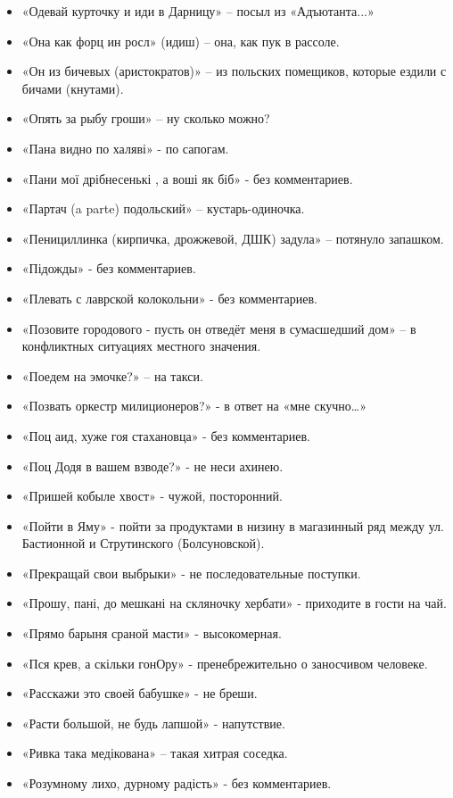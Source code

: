 \begin{itemize}
\item  «Одевай курточку и иди в Дарницу» –  посыл из «Адъютанта...»
\item  «Она как форц ин росл» (идиш) – она, как пук в рассоле.
\item  «Он из бичевых (аристократов)» – из польских помещиков, которые ездили с бичами (кнутами). 
\item  «Опять за рыбу гроши» – ну сколько можно?
\item  «Пана видно по халяві» - по сапогам.
\item  «Пани мої дрібнесенькі , а воші як біб» - без комментариев.
\item  «Партач (a parte) подольский» – кустарь-одиночка.  
\item  «Пенициллинка (кирпичка, дрожжевой, ДШК) задула» – потянуло запашком.
\item  «Підожды» - без комментариев.
\item  «Плевать с лаврской колокольни» - без комментариев.
\item  «Позовите городового - пусть он отведёт меня в сумасшедший дом» – в конфликтных ситуациях местного значения.
\item  «Поедем на эмочке?» – на такси.
\item  «Позвать оркестр милиционеров?» - в ответ на «мне скучно…»
\item  «Поц аид, хуже гоя стахановца» - без комментариев.
\item  «Поц Додя в вашем взводе?» - не неси ахинею.
\item  «Пришей кобыле хвост» - чужой, посторонний.
\item  «Пойти в Яму» - пойти за продуктами в низину в магазинный ряд между ул. Бастионной и Струтинского (Болсуновской). 
\item  «Прекращай свои выбрыки» - не последовательные поступки.
\item  «Прошу, пані, до мешкані на скляночку хербати» - приходите в гости на чай.
\item  «Прямо барыня сраной масти» - высокомерная.
\item  «Пся крев, а скільки гонОру» - пренебрежительно о заносчивом человеке.
\item  «Расскажи это своей бабушке» - не бреши.
\item  «Расти большой, не будь лапшой» - напутствие.
\item  «Ривка така медікована» – такая хитрая соседка.
\item  «Розумному лихо, дурному радість» - без комментариев.

\end{itemize}
